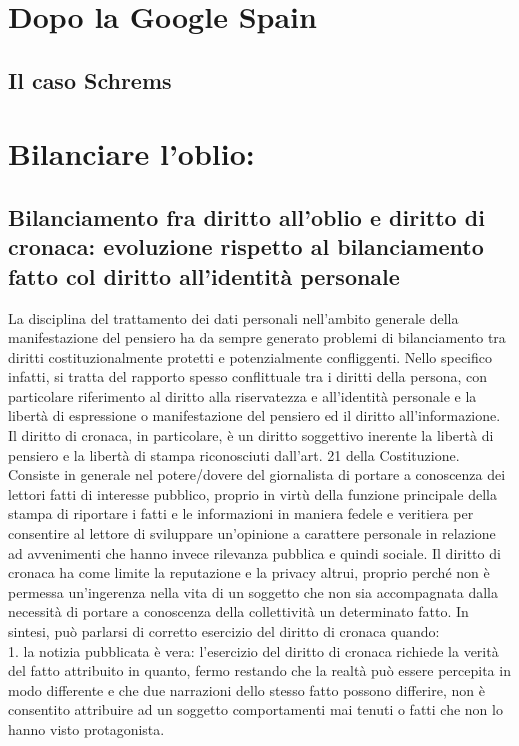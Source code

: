 \section{Dopo la Google Spain}
\subsection{Il caso Schrems}

\section{Bilanciare l'oblio:}
\subsection{Bilanciamento fra diritto all'oblio e diritto di cronaca: evoluzione rispetto al bilanciamento fatto col diritto all'identità personale}
La disciplina del trattamento dei dati personali nell'ambito generale della manifestazione del pensiero ha da sempre generato problemi di bilanciamento tra diritti costituzionalmente protetti e potenzialmente confliggenti.
Nello specifico infatti, si tratta del rapporto spesso conflittuale tra i diritti della persona, con particolare riferimento al diritto alla riservatezza e all'identità personale e la libertà di espressione o manifestazione del pensiero ed il diritto all'informazione. Il diritto di cronaca, in particolare, è un diritto soggettivo inerente la libertà di pensiero e la libertà di stampa riconosciuti dall'art. 21  della Costituzione. Consiste in generale nel potere/dovere del giornalista di portare a conoscenza dei lettori fatti di interesse pubblico, proprio in virtù della funzione principale della stampa di riportare i fatti e le informazioni in maniera fedele e veritiera per consentire al lettore di sviluppare un'opinione a carattere personale in relazione ad avvenimenti che hanno invece rilevanza pubblica e quindi sociale.
Il diritto di cronaca ha come limite la reputazione e la privacy altrui, proprio perché non è permessa un'ingerenza nella vita di un soggetto che non sia accompagnata dalla necessità di portare a conoscenza della collettività un determinato fatto.
In sintesi, può parlarsi di corretto esercizio del diritto di cronaca quando:
\\1. la notizia pubblicata è vera: l'esercizio del diritto di cronaca richiede la verità del fatto attribuito in quanto, fermo restando che la realtà può essere percepita in modo differente e che due narrazioni dello stesso fatto possono differire, non è consentito attribuire ad un soggetto comportamenti mai tenuti o fatti che non lo hanno visto protagonista.
